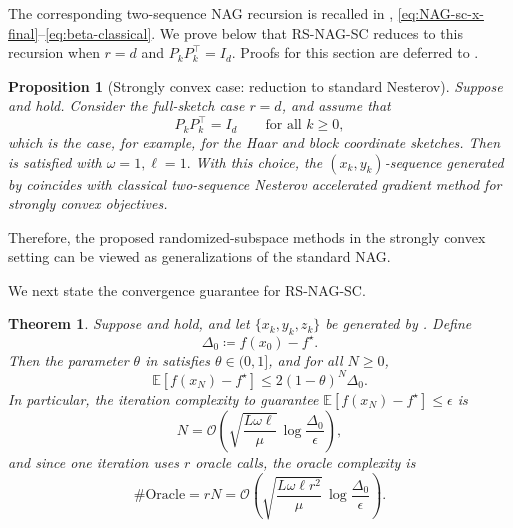 \documentclass[10pt]{article}
\newtheorem{theorem}{Theorem}[section]
\newtheorem{proposition}[proposition]{Proposition}
\newcommand{\E}{\mathbb{E}}
\begin{document}
The corresponding two-sequence NAG recursion is recalled in
,
\eqref{eq:NAG-sc-x-final}--\eqref{eq:beta-classical}. We prove below that RS-NAG-SC reduces to this
recursion when \(r=d\) and \(P_kP_k^\top=I_d\). Proofs for this section are
deferred to .





\begin{proposition}[Strongly convex case: reduction to standard Nesterov]
\label{prop:strong-reduction-nesterov}
Suppose  and
 hold. Consider the full-sketch case \(r=d\), and assume that
\[
P_kP_k^\top=I_d
\qquad\text{for all }k\ge0,
\]
which is the case, for example, for the Haar and block coordinate sketches.
Then  is satisfied with
\(
\omega=1, \ell=1.
\)
With this choice, the \((x_k,y_k)\)-sequence generated by
 coincides with classical two-sequence
Nesterov accelerated gradient method
for strongly convex objectives.
\end{proposition}



Therefore, the proposed randomized-subspace methods in the strongly convex
setting can be viewed as generalizations of the standard NAG.

We next state the convergence guarantee for RS-NAG-SC.


\begin{theorem}
\label{thm:rs-nesterov-strong}
Suppose 
 and  hold,
and let \(\{x_k,y_k,z_k\}\) be generated by
. Define
\[
\Delta_0\coloneqq f(x_0)-f^\star.
\]
Then the parameter \(\theta\) in  satisfies
\(\theta\in(0,1]\), and for all \(N\ge0\),
\begin{equation}
\E[f(x_N)-f^\star]
\le
2(1-\theta)^N\Delta_0.
\label{eq:main-rate}
\end{equation}
In particular, the iteration complexity to guarantee
\(\E[f(x_N)-f^\star]\le\epsilon\) is
\[
N
=
\mathcal{O}\!\left(
\sqrt{\frac{L\omega\ell}{\mu}}\,
\log\frac{\Delta_0}{\epsilon}
\right),
\]
and since one iteration uses \(r\) oracle calls, the oracle complexity is
\begin{equation}
\#\mathrm{Oracle}
=
rN
=
\mathcal{O}\!\left(
\sqrt{\frac{L\omega\ell r^2}{\mu}}\,
\log\frac{\Delta_0}{\epsilon}
\right).
\label{eq:oracle-lower-omega}
\end{equation}
\end{theorem}
\end{document}
